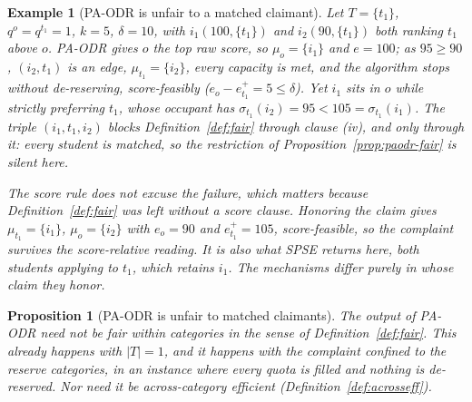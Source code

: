 \documentclass[a4paper,twoside]{article}
\newtheorem{proposition}{Proposition}
\newtheorem{example}{Example}
\theoremstyle{definition}
\begin{document}
\begin{example}[PA-ODR is unfair to a matched claimant]
\label{ex:paodr-envy}
Let $T=\{t_1\}$, $q^o=q^{t_1}=1$, $k=5$, $\delta=10$, with $i_1(100,\{t_1\})$ and $i_2(90,\{t_1\})$ both ranking $t_1$ above $o$. PA-ODR gives $o$ the top raw score, so $\mu_o=\{i_1\}$ and $e=100$; as $95\ge90$, $(i_2,t_1)$ is an edge, $\mu_{t_1}=\{i_2\}$, every capacity is met, and the algorithm stops without de-reserving, score-feasibly ($e_o-e_{t_1}^+=5\le\delta$). Yet $i_1$ sits in $o$ while strictly preferring $t_1$, whose occupant has $\sigma_{t_1}(i_2)=95<105=\sigma_{t_1}(i_1)$. The triple $(i_1,t_1,i_2)$ blocks Definition~\ref{def:fair} through clause (iv), and only through it: every student is matched, so the restriction of Proposition~\ref{prop:paodr-fair} is silent here.

The score rule does not excuse the failure, which matters because Definition~\ref{def:fair} was left without a score clause. Honoring the claim gives $\mu_{t_1}=\{i_1\}$, $\mu_o=\{i_2\}$ with $e_o=90$ and $e_{t_1}^+=105$, score-feasible, so the complaint survives the score-relative reading. It is also what SPSE returns here, both students applying to $t_1$, which retains $i_1$. The mechanisms differ purely in whose claim they honor.
\end{example}

\begin{proposition}[PA-ODR is unfair to matched claimants]
\label{prop:paodr-unfair}
The output of PA-ODR need not be fair within categories in the sense of Definition~\ref{def:fair}. This already happens with $|T|=1$, and it happens with the complaint confined to the reserve categories, in an instance where every quota is filled and nothing is de-reserved. Nor need it be across-category efficient (Definition~\ref{def:acrosseff}).
\end{proposition}
\end{document}
